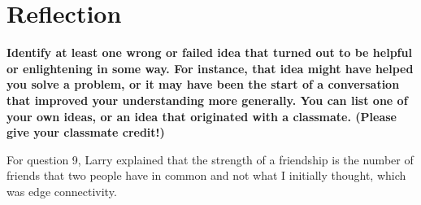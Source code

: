 \documentclass[article, 12pt]{article}
\theoremstyle{definition}
\begin{document}
    \section{Reflection}
    \textbf{Identify at least one wrong or failed idea that turned out to be helpful or enlightening in some way. For instance, that idea might have helped you solve a problem, or it may have been the start of a conversation that improved your understanding more generally. You can list one of your own ideas, or an idea that originated with a classmate. (Please give your classmate credit!)}

    For question 9, Larry explained that the strength of a friendship is the number of friends that two people have in common and not what I initially thought, which was edge connectivity. 
\end{document}

